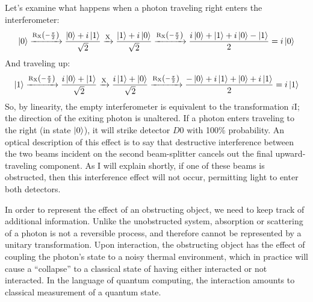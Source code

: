 \documentclass{article}
\newcommand{\I}{\text{I}}
\newcommand{\X}{\text{X}}
\newcommand{\RX}{\mathrm{R_X}}
\begin{document}
Let's examine what happens when a photon traveling right enters the interferometer:
\begin{equation} \label{eq:seq_0}
\ket 0 \xrightarrow{\RX\left(-\frac{\pi}{2}\right)} \frac{\ket 0 + i\ket 1}{\sqrt{2}} \xrightarrow{\X} \frac{\ket 1 + i\ket 0}{\sqrt{2}} \xrightarrow{\RX\left(-\frac{\pi}{2}\right)} \frac{i\ket 0 + \ket 1 + i\ket 0 - \ket 1}{2} = i\ket 0
\end{equation}
And traveling up:
\begin{equation} \label{eq:seq_1}
\ket 1 \xrightarrow{\RX\left(-\frac{\pi}{2}\right)} \frac{i\ket 0 + \ket 1}{\sqrt{2}} \xrightarrow{\X} \frac{i\ket 1 + \ket 0}{\sqrt{2}} \xrightarrow{\RX\left(-\frac{\pi}{2}\right)} \frac{-\ket 0 + i\ket 1 + \ket 0 + i\ket 1}{2} = i\ket 1
\end{equation}
So, by linearity, the empty interferometer is equivalent to the transformation $i\I$; the direction of the exiting photon is unaltered. If a photon enters traveling to the right (in state $\ket 0$), it will strike detector $D0$ with 100\% probability. An optical description of this effect is to say that destructive interference between the two beams incident on the second beam-splitter cancels out the final upward-traveling component. As I will explain shortly, if one of these beams is obstructed, then this interference effect will not occur, permitting light to enter both detectors.

In order to represent the effect of an obstructing object, we need to keep track of additional information. Unlike the unobstructed system, absorption or scattering of a photon is not a reversible process, and therefore cannot be represented by a unitary transformation. Upon interaction, the obstructing object has the effect of coupling the photon's state to a noisy thermal environment, which in practice will cause a ``collapse'' to a classical state of having either interacted or not interacted. In the language of quantum computing, the interaction amounts to classical measurement of a quantum state.
\end{document}
